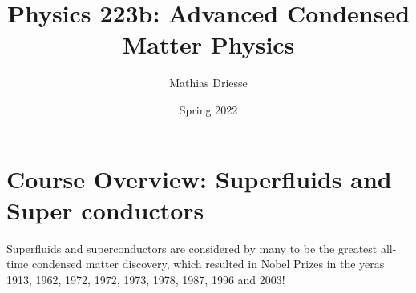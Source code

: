 \documentclass{article}
\title{Physics 223b: Advanced Condensed Matter Physics}
\date{Spring 2022}
\author{Mathias Driesse}
\begin{document}
    

\begin{titlepage}
    \maketitle
    
\end{titlepage}

\section{Course Overview: Superfluids and Super conductors}

Superfluids and superconductors are considered by many to be the greatest all-time condensed matter discovery, which resulted in Nobel Prizes in the yeras 1913, 1962, 1972, 1972, 1973, 1978, 1987, 1996 and 2003!





\end{document}
